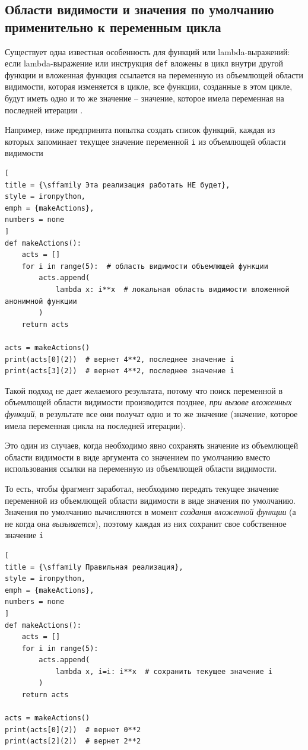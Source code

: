 \documentclass[%
	11pt,
	a4paper,
	utf8,
		]{article}
\begin{document}
\subsection{Области видимости и значения по умолчанию применительно к переменным цикла}

Существует одна известная особенность для функций или lambda-выражений: если lambda-выражение или инструкция \texttt{def} вложены в цикл внутри другой функции и вложенная функция ссылается на переменную из объемлющей области видимости, которая изменяется в цикле, все функции, созданные в этом цикле, будут иметь одно и то же значение -- значение, которое имела переменная на последней итерации \cite[]{lutz:learningpython-2011}.

Например, ниже предпринята попытка создать список функций, каждая из которых запоминает текущее значение переменной \texttt{i} из объемлющей области видимости

\begin{lstlisting}[
title = {\sffamily Эта реализация работать НЕ будет},
style = ironpython,
emph = {makeActions},
numbers = none
]
def makeActions():
    acts = []
    for i in range(5):  # область видимости объемлющей функции
        acts.append(
            lambda x: i**x  # локальная область видимости вложенной анонимной функции
        ) 
    return acts
    
acts = makeActions()
print(acts[0](2))  # вернет 4**2, последнее значение i
print(acts[3](2))  # вернет 4**2, последнее значение i
\end{lstlisting}

Такой подход не дает желаемого результата, потому что поиск переменной в объемлющей области видимости производится позднее, \emph{при вызове вложенных функций}, в результате все они получат одно и то же значение (значение, которое имела переменная цикла на последней итерации).

Это один из случаев, когда необходимо явно сохранять значение из объемлющей области видимости в виде аргумента со значением по умолчанию вместо использования ссылки на переменную из объемлющей области видимости.

То есть, чтобы фрагмент заработал, необходимо передать текущее значение переменной из объемлющей области видимости в виде значения по умолчанию. Значения по умолчанию вычисляются в момент \emph{создания вложенной функции} (а не когда она \emph{вызывается}), поэтому каждая из них сохранит свое собственное значение \texttt{i}

\begin{lstlisting}[
title = {\sffamily Правильная реализация},
style = ironpython,
emph = {makeActions},
numbers = none
]
def makeActions():
    acts = []
    for i in range(5):
        acts.append(
            lambda x, i=i: i**x  # сохранить текущее значение i
        )
    return acts

acts = makeActions()
print(acts[0](2))  # вернет 0**2
print(acts[2](2))  # вернет 2**2
\end{lstlisting}
\end{document}
